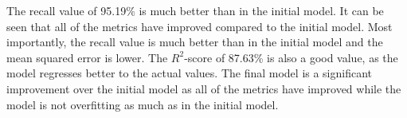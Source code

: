 The recall value of 95.19\% is much better than in the initial model.
It can be seen that all of the metrics have improved compared to the initial model.
Most importantly, the recall value is much better than in the initial model and the mean squared error is lower.
The $R^2$-score of 87.63\% is also a good value, as the model regresses better to the actual values.
The final model is a significant improvement over the initial model as all of the metrics have improved while the model is not overfitting as much as in the initial model.
